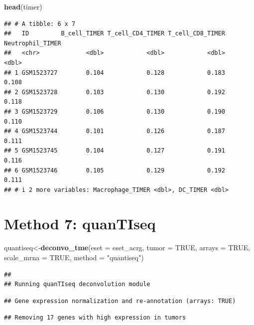 \documentclass[
  12pt,
]{book}
\newenvironment{Shaded}{\begin{snugshade}}{\end{snugshade}}
\newcommand{\AttributeTok}[1]{\textcolor[rgb]{0.13,0.29,0.53}{#1}}
\newcommand{\ConstantTok}[1]{\textcolor[rgb]{0.56,0.35,0.01}{#1}}
\newcommand{\FunctionTok}[1]{\textcolor[rgb]{0.13,0.29,0.53}{\textbf{#1}}}
\newcommand{\NormalTok}[1]{#1}
\newcommand{\OtherTok}[1]{\textcolor[rgb]{0.56,0.35,0.01}{#1}}
\newcommand{\StringTok}[1]{\textcolor[rgb]{0.31,0.60,0.02}{#1}}
\theoremstyle{definition}
\theoremstyle{definition}
\theoremstyle{definition}
\theoremstyle{definition}
\theoremstyle{remark}
\begin{document}
\begin{Shaded}
\begin{Highlighting}[]
\FunctionTok{head}\NormalTok{(timer)}
\end{Highlighting}
\end{Shaded}

\begin{verbatim}
## # A tibble: 6 x 7
##   ID         B_cell_TIMER T_cell_CD4_TIMER T_cell_CD8_TIMER Neutrophil_TIMER
##   <chr>             <dbl>            <dbl>            <dbl>            <dbl>
## 1 GSM1523727        0.104            0.128            0.183            0.108
## 2 GSM1523728        0.103            0.130            0.192            0.118
## 3 GSM1523729        0.106            0.130            0.190            0.110
## 4 GSM1523744        0.101            0.126            0.187            0.111
## 5 GSM1523745        0.104            0.127            0.191            0.116
## 6 GSM1523746        0.105            0.129            0.192            0.111
## # i 2 more variables: Macrophage_TIMER <dbl>, DC_TIMER <dbl>
\end{verbatim}

\hypertarget{method-7-quantiseq}{%
\section{Method 7: quanTIseq}\label{method-7-quantiseq}}

\begin{Shaded}
\begin{Highlighting}[]
\NormalTok{quantiseq}\OtherTok{\textless{}{-}}\FunctionTok{deconvo\_tme}\NormalTok{(}\AttributeTok{eset =}\NormalTok{ eset\_acrg, }\AttributeTok{tumor =} \ConstantTok{TRUE}\NormalTok{, }\AttributeTok{arrays =} \ConstantTok{TRUE}\NormalTok{, }\AttributeTok{scale\_mrna =} \ConstantTok{TRUE}\NormalTok{, }\AttributeTok{method =} \StringTok{"quantiseq"}\NormalTok{)}
\end{Highlighting}
\end{Shaded}

\begin{verbatim}
## 
## Running quanTIseq deconvolution module
\end{verbatim}

\begin{verbatim}
## Gene expression normalization and re-annotation (arrays: TRUE)
\end{verbatim}

\begin{verbatim}
## Removing 17 genes with high expression in tumors
\end{verbatim}
\end{document}
